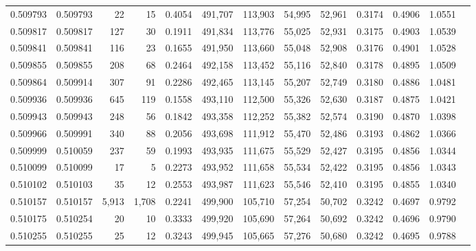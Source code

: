 \begin{tabular}{rrrrrrrrrrrrr}
0.509793 & 0.509793 &    22 &    15 &                                     0.4054 & 491,707 & 113,903 &  54,995 &  52,961 & 0.3174 & 0.4906 & 1.0551 \\
0.509817 & 0.509817 &   127 &    30 &                                     0.1911 & 491,834 & 113,776 &  55,025 &  52,931 & 0.3175 & 0.4903 & 1.0539 \\
0.509841 & 0.509841 &   116 &    23 &                                     0.1655 & 491,950 & 113,660 &  55,048 &  52,908 & 0.3176 & 0.4901 & 1.0528 \\
0.509855 & 0.509855 &   208 &    68 &                                     0.2464 & 492,158 & 113,452 &  55,116 &  52,840 & 0.3178 & 0.4895 & 1.0509 \\
0.509864 & 0.509914 &   307 &    91 &                                     0.2286 & 492,465 & 113,145 &  55,207 &  52,749 & 0.3180 & 0.4886 & 1.0481 \\
0.509936 & 0.509936 &   645 &   119 &                                     0.1558 & 493,110 & 112,500 &  55,326 &  52,630 & 0.3187 & 0.4875 & 1.0421 \\
0.509943 & 0.509943 &   248 &    56 &                                     0.1842 & 493,358 & 112,252 &  55,382 &  52,574 & 0.3190 & 0.4870 & 1.0398 \\
0.509966 & 0.509991 &   340 &    88 &                                     0.2056 & 493,698 & 111,912 &  55,470 &  52,486 & 0.3193 & 0.4862 & 1.0366 \\
0.509999 & 0.510059 &   237 &    59 &                                     0.1993 & 493,935 & 111,675 &  55,529 &  52,427 & 0.3195 & 0.4856 & 1.0344 \\
0.510099 & 0.510099 &    17 &     5 &                                     0.2273 & 493,952 & 111,658 &  55,534 &  52,422 & 0.3195 & 0.4856 & 1.0343 \\
0.510102 & 0.510103 &    35 &    12 &                                     0.2553 & 493,987 & 111,623 &  55,546 &  52,410 & 0.3195 & 0.4855 & 1.0340 \\
0.510157 & 0.510157 & 5,913 & 1,708 &                                     0.2241 & 499,900 & 105,710 &  57,254 &  50,702 & 0.3242 & 0.4697 & 0.9792 \\
0.510175 & 0.510254 &    20 &    10 &                                     0.3333 & 499,920 & 105,690 &  57,264 &  50,692 & 0.3242 & 0.4696 & 0.9790 \\
0.510255 & 0.510255 &    25 &    12 &                                     0.3243 & 499,945 & 105,665 &  57,276 &  50,680 & 0.3242 & 0.4695 & 0.9788 \\

\end{tabular}
